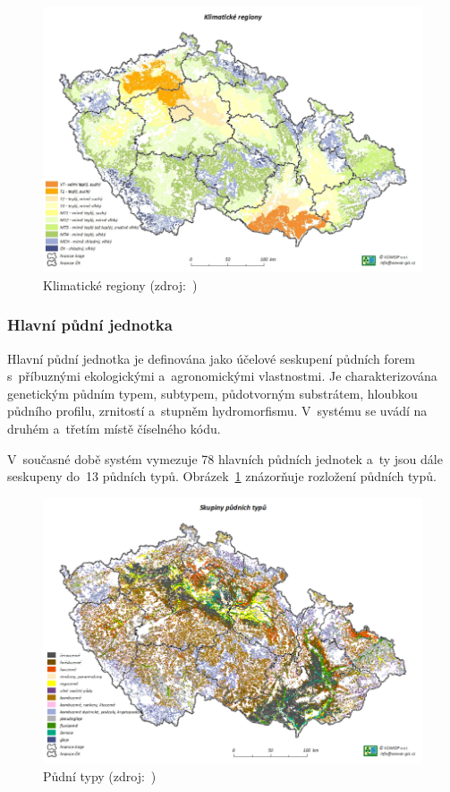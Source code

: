 	\begin{figure}[H]
		\centering
		\includegraphics[width=.9\textwidth]{./pictures/klimaticky_region.png}
		\caption[Klimatické regiony]{Klimatické regiony (zdroj:~\citep{vumop_bpej})}
		\label{fig:klimaticke_regiony}
 	\end{figure}

\subsubsection{Hlavní půdní jednotka}
\label{hpj}

Hlavní půdní jednotka je definována jako účelové seskupení půdních forem s~příbuznými ekologickými a~agronomickými vlastnostmi. Je charakterizována genetickým půdním typem, subtypem, půdotvorným substrátem, hloubkou půdního profilu, zrnitostí a~stupněm hydromorfismu. V~systému  se uvádí na druhém a~třetím místě číselného kódu.

V~současné době systém  vymezuje 78 hlavních půdních jednotek a~ty jsou dále seskupeny do~13 půdních typů. Obrázek~\ref{fig:klimaticke_regiony} znázorňuje rozložení půdních typů.

	\begin{figure}[H]
		\centering
		\includegraphics[width=.9\textwidth]{./pictures/pudni_typy.png}
		\caption[Půdní typy]{Půdní typy (zdroj:~\citep{vumop_bpej})}
		\label{fig:pudni_typy}
 	\end{figure}

